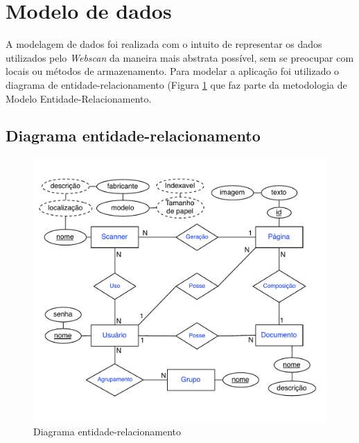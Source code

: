 
\section{Modelo de dados}
\label{sec:casos_de_uso}

A modelagem de dados foi realizada com o intuito de representar os dados utilizados pelo {\it Webscan}
da maneira mais abstrata possível, sem se preocupar com locais ou métodos de armazenamento.
Para modelar a aplicação foi utilizado o diagrama de entidade-relacionamento (Figura \ref{fig:der}
que faz parte da metodologia de Modelo Entidade-Relacionamento. 

\subsection{Diagrama entidade-relacionamento}
\begin{figure}[ht]
 \centering
  \includegraphics[scale=0.75]{img/der.pdf}
  \caption {Diagrama entidade-relacionamento}
  \label{fig:der}
\end{figure}
